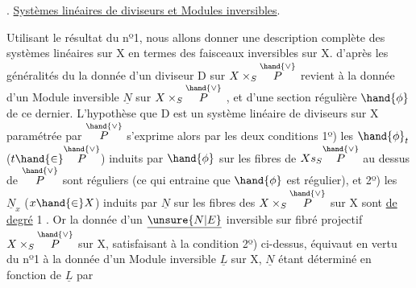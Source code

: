 
. \uline{Systèmes linéaires de diviseurs et Modules inversibles}.

Utilisant le résultat du nº1, nous allons donner une description
complète des systèmes linéaires sur X en termes des faisceaux inversibles
sur X.   d'après les généralités du  la donnée d'un
diviseur  D sur $X\times_S\overset{\hand{\vee}}{P}$  revient à la
donnée d'un Module inversible $\underline{N}$ sur $X\times_S\overset{\hand{\vee}}{P}$ , et d'une section régulière
$\hand{\phi}$ de ce dernier.  L'hypothèse que D est un système linéaire de
diviseurs sur X paramétrée par $\overset{\hand{\vee}}{P}$ s'exprime alors par les deux conditions
1º) les $\hand{\phi}_t$ ($t\hand{\in}\overset{\hand{\vee}}{P}$) induits par $\hand{\phi}$ sur les fibres de $Xs_S\overset{\hand{\vee}}{P}$ au dessus de $\overset{\hand{\vee}}{P}$
sont réguliers (ce qui entraine que $\hand{\phi}$ est régulier), et 2º) les $\underline{N}_x$ ($x\hand{\in} X$)
induits par $\underline{N}$  sur les fibres des $X\times_S\overset{\hand{\vee}}{P}$ sur X sont \uline{de degré} 1 .
Or la donnée d'un $\underline{\unsure{N|E}}$ inversible sur  fibré projectif $X\times_S\overset{\hand{\vee}}{P}$ sur X,
satisfaisant à la condition 2º) ci-dessus, équivaut en vertu du nº1
à la donnée d'un Module inversible $\underline{L}$ sur X, $\underline{N}$ étant déterminé en fonction
de $\underline{L}$ par
